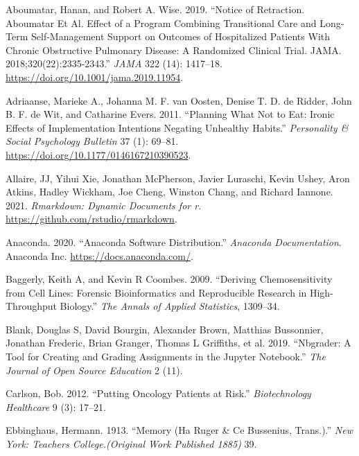 \documentclass{article}
\newlength{\cslhangindent}
\newenvironment{CSLReferences}[2] %
 {%
  \setlength{\parindent}{0pt}
  \ifodd #1 \everypar{\setlength{\hangindent}{\cslhangindent}}\ignorespaces\fi
  \ifnum #2 > 0
  \setlength{\parskip}{#2\baselineskip}
  \fi
 }%
 {}
\begin{document}
\hypertarget{refs}{}
\begin{CSLReferences}{1}{0}
\leavevmode{}%
Aboumatar, Hanan, and Robert A. Wise. 2019. {``Notice of {Retraction}.
{Aboumatar} Et Al. {Effect} of a {Program Combining Transitional Care}
and {Long}-Term {Self}-Management {Support} on {Outcomes} of
{Hospitalized Patients With Chronic Obstructive Pulmonary Disease}: {A
Randomized Clinical Trial}. {JAMA}. 2018;320(22):2335-2343.''}
\emph{JAMA} 322 (14): 1417--18.
\url{https://doi.org/10.1001/jama.2019.11954}.

\leavevmode{}%
Adriaanse, Marieke A., Johanna M. F. van Oosten, Denise T. D. de Ridder,
John B. F. de Wit, and Catharine Evers. 2011. {``Planning What Not to
Eat: Ironic Effects of Implementation Intentions Negating Unhealthy
Habits.''} \emph{Personality \& Social Psychology Bulletin} 37 (1):
69--81. \url{https://doi.org/10.1177/0146167210390523}.

\leavevmode{}%
Allaire, JJ, Yihui Xie, Jonathan McPherson, Javier Luraschi, Kevin
Ushey, Aron Atkins, Hadley Wickham, Joe Cheng, Winston Chang, and
Richard Iannone. 2021. \emph{Rmarkdown: Dynamic Documents for r}.
\url{https://github.com/rstudio/rmarkdown}.

\leavevmode{}%
Anaconda. 2020. {``Anaconda Software Distribution.''} \emph{Anaconda
Documentation}. Anaconda Inc. \url{https://docs.anaconda.com/}.

\leavevmode{}%
Baggerly, Keith A, and Kevin R Coombes. 2009. {``Deriving
Chemosensitivity from Cell Lines: Forensic Bioinformatics and
Reproducible Research in High-Throughput Biology.''} \emph{The Annals of
Applied Statistics}, 1309--34.

\leavevmode{}%
Blank, Douglas S, David Bourgin, Alexander Brown, Matthias Bussonnier,
Jonathan Frederic, Brian Granger, Thomas L Griffiths, et al. 2019.
{``Nbgrader: A Tool for Creating and Grading Assignments in the Jupyter
Notebook.''} \emph{The Journal of Open Source Education} 2 (11).

\leavevmode{}%
Carlson, Bob. 2012. {``Putting {Oncology Patients} at {Risk}.''}
\emph{Biotechnology Healthcare} 9 (3): 17--21.

\leavevmode{}%
Ebbinghaus, Hermann. 1913. {``Memory (Ha Ruger \& Ce Bussenius,
Trans.).''} \emph{New York: Teachers College.(Original Work Published
1885)} 39.


\end{CSLReferences}
\end{document}
